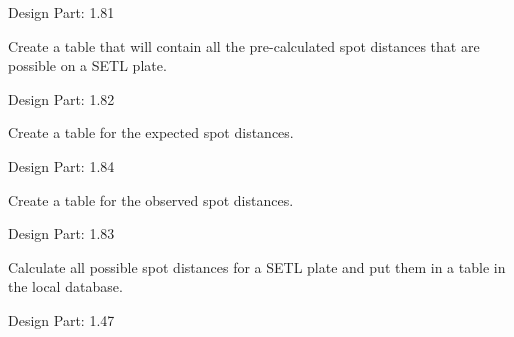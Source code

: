 \documentclass[letterpaper,10pt,english]{sphinxmanual}
\begin{document}
\begin{fulllineitems}
\begin{fulllineitems}
Design Part: 1.81

\end{fulllineitems}


\begin{fulllineitems}
\label{setlyze/database:setlyze.database.MakeLocalDB.create_table_spot_distances}
Create a table that will contain all the pre-calculated
spot distances that are possible on a SETL plate.

Design Part: 1.82

\end{fulllineitems}


\begin{fulllineitems}
\label{setlyze/database:setlyze.database.MakeLocalDB.create_table_spot_distances_expected}
Create a table for the expected spot distances.

Design Part: 1.84

\end{fulllineitems}


\begin{fulllineitems}
\label{setlyze/database:setlyze.database.MakeLocalDB.create_table_spot_distances_observed}
Create a table for the observed spot distances.

Design Part: 1.83

\end{fulllineitems}


\begin{fulllineitems}
\label{setlyze/database:setlyze.database.MakeLocalDB.fill_distance_table}
Calculate all possible spot distances for a SETL plate and put
them in a table in the local database.

Design Part: 1.47

\end{fulllineitems}


\end{fulllineitems}
\end{document}
